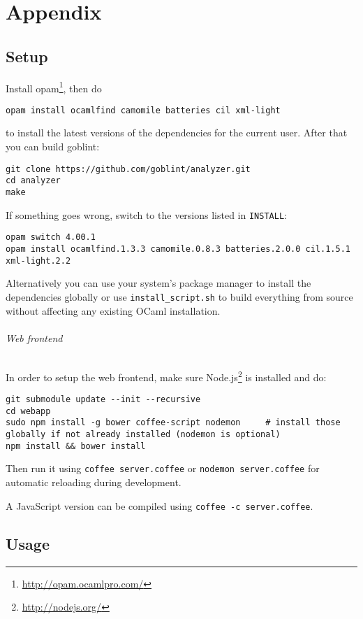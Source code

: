 \part*{Appendix}
\label{appendix}

\appendix %


\chapter{Setup}
\label{chap:app:setup}
Install opam\footnote{\url{http://opam.ocamlpro.com/}}, then do
\begin{lstlisting}
opam install ocamlfind camomile batteries cil xml-light
\end{lstlisting}
to install the latest versions of the dependencies for the current user. After that you can build goblint:

\begin{lstlisting}
git clone https://github.com/goblint/analyzer.git
cd analyzer
make
\end{lstlisting}
If something goes wrong, switch to the versions listed in \verb|INSTALL|:
\begin{lstlisting}
opam switch 4.00.1
opam install ocamlfind.1.3.3 camomile.0.8.3 batteries.2.0.0 cil.1.5.1 xml-light.2.2
\end{lstlisting}
Alternatively you can use your system's package manager to install the dependencies globally or use \verb|install_script.sh| to build everything from source without affecting any existing OCaml installation.

\paragraph*{Web frontend}
In order to setup the web frontend, make sure Node.js\footnote{\url{http://nodejs.org/}} is installed and do:
\begin{lstlisting}
git submodule update --init --recursive
cd webapp
sudo npm install -g bower coffee-script nodemon     # install those globally if not already installed (nodemon is optional)
npm install && bower install
\end{lstlisting}
Then run it using \verb|coffee server.coffee| or \verb|nodemon server.coffee| for automatic reloading during development.

A JavaScript version can be compiled using \verb|coffee -c server.coffee|.


\chapter{Usage}
\label{chap:app:usage}
